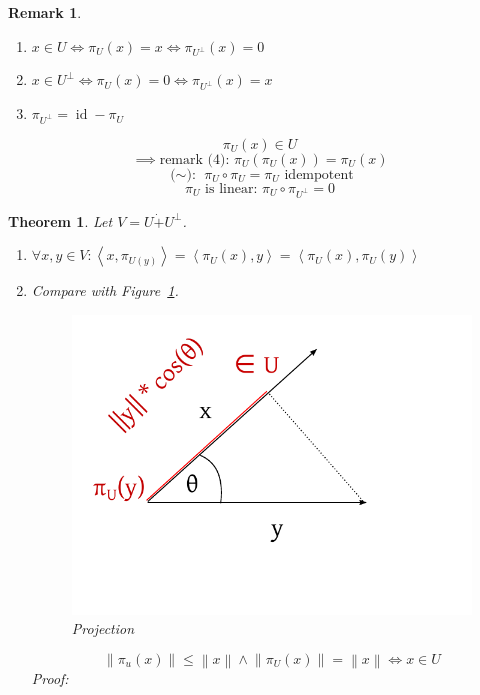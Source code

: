 \documentclass{article}
\newtheorem{theorem}{Theorem}  \numberwithin{theorem}{section}
\newtheorem{remark}{Remark}  \numberwithin{remark}{section}
\newcommand{\ip}[2]{\left\langle#1,#2\right\rangle} %
\newcommand{\norm}[1]{\left\|#1\right\|}
\begin{document}
\begin{remark}
  \begin{enumerate}
    \item $x \in U \iff \pi_U(x) = x \iff \pi_{U^\bot}(x) = 0$
    \item $x \in U^\bot \iff \pi_U(x) = 0 \iff \pi_{U^\bot}(x) = x$
    \item $\pi_{U^\bot} = \operatorname{id} - \pi_U$
  \end{enumerate}
\end{remark}

\[ \pi_U(x) \in U \]
\[ \implies \text{remark (4): } \pi_U(\pi_U(x)) = \pi_U(x) \]
\[ \text{($\sim$): } \pi_U \circ \pi_U = \pi_U \text{ idempotent} \]
\[ \pi_U \text{ is linear: } \pi_U \circ \pi_{U^\bot} = 0 \]

\begin{theorem} %
  Let $V = U \dot+ U^{\bot}$.
  \begin{enumerate}
    \item $\forall x, y \in V: \ip{x}{\pi_{U(y)}} = \ip{\pi_U(x)}{y} = \ip{\pi_U(x)}{\pi_U(y)}$
    \item Compare with Figure~\ref{img:proj}.
      \begin{figure}[!h]
        \begin{center}
          \includegraphics{img/10_projection.pdf}
          \caption{Projection}
          \label{img:proj}
        \end{center}
      \end{figure}
        \[ \norm{\pi_{u}(x)} \leq \norm{x} \land \norm{\pi_U(x)} = \norm{x} \iff x \in U \]
        Proof:
        \begin{enumerate}

\end{enumerate}
\end{enumerate}
\end{theorem}
\end{document}
